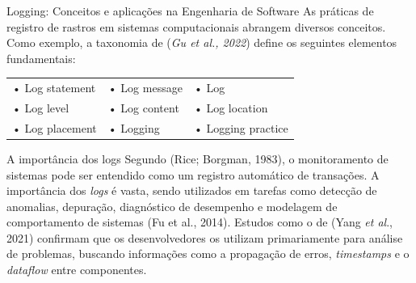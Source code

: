 \documentclass{if-beamer}
\begin{document}
\begin{frame}{Logging: Conceitos e aplicações na Engenharia de Software}
As práticas de registro de rastros em sistemas computacionais abrangem diversos conceitos. Como exemplo, a taxonomia de (\textit{Gu et al., 2022}) define os seguintes elementos fundamentais: \\
\vspace{0.2in}
\begingroup
\renewcommand{\arraystretch}{1.2}
\begin{tabular}{p{}p{}p{}}
    • Log statement       & • Log message     & • Log \\
    • Log level           & • Log content     & • Log location \\
    • Log placement       & • Logging         & • Logging practice \\
\end{tabular}
\endgroup

\end{frame}
\large
\begin{frame}{A importância dos logs}
Segundo (Rice; Borgman, 1983), o monitoramento de sistemas pode ser entendido como
um registro automático de transações. A importância dos \textit{logs} é vasta, sendo utilizados em tarefas como detecção de anomalias, depuração, diagnóstico de desempenho e modelagem de comportamento de sistemas (Fu et al., 2014). Estudos como o de (Yang \textit{et al}., 2021) confirmam que os desenvolvedores os utilizam primariamente para análise de problemas, buscando informações como a propagação de erros, \textit{timestamps} e o \textit{dataflow} entre componentes.

\end{frame}
\end{document}
